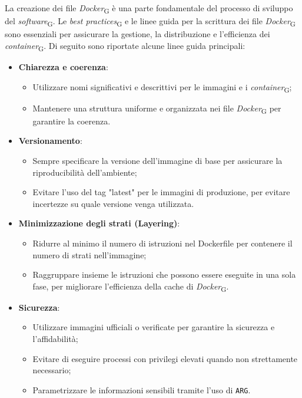 La creazione dei file \textit{Docker}\textsubscript{G} è una parte fondamentale del processo di sviluppo del \textit{software}\textsubscript{G}. Le \textit{best practices}\textsubscript{G} e le linee guida per la scrittura dei file \textit{Docker}\textsubscript{G} sono essenziali per assicurare la gestione, la distribuzione e l'efficienza dei \textit{container}\textsubscript{G}. Di seguito sono riportate alcune linee guida principali:
\begin{itemize}
    \item \textbf{Chiarezza e coerenza}:
    \begin{itemize}
        \item Utilizzare nomi significativi e descrittivi per le immagini e i \textit{container}\textsubscript{G};
        \item Mantenere una struttura uniforme e organizzata nei file \textit{Docker}\textsubscript{G} per garantire la coerenza.
    \end{itemize}
    \item \textbf{Versionamento}:
    \begin{itemize}
        \item Sempre specificare la versione dell'immagine di base per assicurare la riproducibilità dell'ambiente;
        \item Evitare l'uso del tag "latest" per le immagini di produzione, per evitare incertezze su quale versione venga utilizzata.
    \end{itemize}
    \item \textbf{Minimizzazione degli strati (Layering)}:
    \begin{itemize}
        \item Ridurre al minimo il numero di istruzioni nel Dockerfile per contenere il numero di strati nell'immagine;
        \item Raggruppare insieme le istruzioni che possono essere eseguite in una sola fase, per migliorare l'efficienza della cache di \textit{Docker}\textsubscript{G}.
    \end{itemize}
    \item \textbf{Sicurezza}:
    \begin{itemize}
        \item Utilizzare immagini ufficiali o verificate per garantire la sicurezza e l'affidabilità;
        \item Evitare di eseguire processi con privilegi elevati quando non strettamente necessario;
        \item Parametrizzare le informazioni sensibili tramite l'uso di \texttt{ARG}.

\end{itemize}
\end{itemize}
